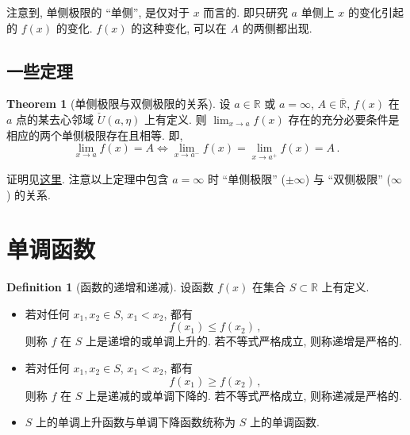 \documentclass{book}
\newcommand{\bideduce}{\Longleftrightarrow}
\newcommand{\exR}{\overline{\mathbb{R}}}
\newcommand{\R}{\mathbb{R}}
\newcommand{\puncU}[1]{\check{U}\!\left( #1 \right)}
\renewcommand{\ge}{\geqslant}
\renewcommand{\le}{\leqslant}
\numberwithin{equation}{section}
\numberwithin{figure}{section}
\theoremstyle{definition}
\newtheorem{definition}{Definition}
\newtheorem{theorem}{Theorem}[section]
\begin{document}
注意到, 单侧极限的 ``单侧'', 是仅对于 $x$ 而言的. 即只研究 $a$ 单侧上 $x$ 的变化引起的 $f(x)$ 的变化. $f(x)$ 的这种变化, 可以在 $A$ 的两侧都出现.

\subsection{一些定理}
\begin{theorem}[单侧极限与双侧极限的关系]
  设 $a\in\R$ 或 $a=\infty$, $A\in\exR$, $f(x)$ 在 $a$ 点的某去心邻域 $\puncU{a,\eta}$ 上有定义. 则 $\lim_{x\to a}f(x)$ 存在的充分必要条件是相应的两个单侧极限存在且相等. 即,
  \begin{equation*}
    \lim_{x\to a}f(x)=A\bideduce\lim_{x\to a^-}f(x)=\lim_{x\to a^+}f(x)=A\,.
  \end{equation*}
  \label{the:OneSideAndTwoSideLimit}
\end{theorem}
证明见\hyperlink{proof:OneSideAndTwoSideLimit}{这里}.
注意以上定理中包含 $a=\infty$ 时 ``单侧极限'' ($\pm\infty$) 与 ``双侧极限'' ($\infty$) 的关系.

\section{单调函数}
\begin{definition}[函数的递增和递减]
  设函数 $f(x)$ 在集合 $S\subset\R$ 上有定义.
  \begin{itemize}
    \item 若对任何 $x_1,x_2\in S$, $x_1<x_2$, 都有
      \begin{equation*}
	f(x_1)\le f(x_2)\,,
      \end{equation*}
      则称 $f$ 在 $S$ 上是递增的或单调上升的. 若不等式严格成立, 则称递增是严格的.
    \item 若对任何 $x_1,x_2\in S$, $x_1<x_2$, 都有
      \begin{equation*}
	f(x_1)\ge f(x_2)\,,
      \end{equation*}
      则称 $f$ 在 $S$ 上是递减的或单调下降的. 若不等式严格成立, 则称递减是严格的.
    \item $S$ 上的单调上升函数与单调下降函数统称为 $S$ 上的单调函数.
  \end{itemize}
\end{definition}
\end{document}
